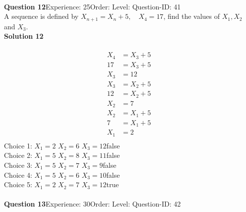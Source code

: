 \documentclass{article}
\begin{document}
\\[4pt]
\noindent\textbf{Question 12}\hspace{20pt}Experience: 25\hspace{20pt}Order: \hspace{20pt}Level: \hspace{20pt}Question-ID: 41\\[2pt]
A sequence is defined by $X_{n+1}=X_n+5, \quad X_4=17$, find the values of $X_1,X_2$ and $X_3$.\\[4pt]
\noindent\textbf{Solution 12}\\[2pt]
\\[-35pt]\begin{align*}
X_4&=X_3+5\\[2pt]
17&=X_3+5\\[2pt]
X_3&=12\\[12pt]
X_3&=X_2+5\\[2pt]
12&=X_2+5\\[2pt]
X_2&=7\\[12pt]
X_2&=X_1+5\\[2pt]
7&=X_1+5\\[2pt]
X_1&=2\\[12pt]
\end{align*}
Choice 1: \hspace{20pt}$X_1=2 \,\, X_2=6 \,\, X_3=12$\hspace{20pt}false\\
Choice 2: \hspace{20pt}$X_1=5 \,\, X_2=8 \,\, X_3=11$\hspace{20pt}false\\
Choice 3: \hspace{20pt}$X_1=5 \,\, X_2=7 \,\, X_3=9$\hspace{20pt}false\\
Choice 4: \hspace{20pt}$X_1=5 \,\, X_2=6 \,\, X_3=10$\hspace{20pt}false\\
Choice 5: \hspace{20pt}$X_1=2 \,\, X_2=7 \,\, X_3=12$\hspace{20pt}true\\
\\[4pt]
\noindent\textbf{Question 13}\hspace{20pt}Experience: 30\hspace{20pt}Order: \hspace{20pt}Level: \hspace{20pt}Question-ID: 42\\[2pt]
\end{document}

